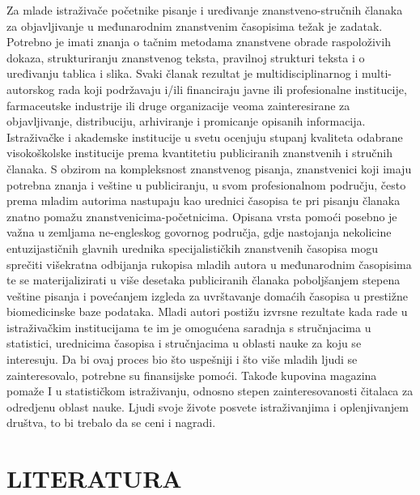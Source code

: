 \documentclass[12pt,a4paper]{article}
\begin{document}
    Za mlade istraživače početnike pisanje i uređivanje znanstveno-stručnih članaka za objavljivanje u međunarodnim znanstvenim časopisima težak je zadatak. Potrebno je imati znanja o tačnim metodama znanstvene obrade raspoloživih dokaza, strukturiranju znanstvenog teksta, pravilnoj strukturi teksta i o uređivanju tablica i slika. Svaki članak rezultat je multidisciplinarnog i multi-autorskog rada koji podržavaju i/ili financiraju javne ili profesionalne institucije, farmaceutske industrije ili druge organizacije veoma zainteresirane za objavljivanje, distribuciju, arhiviranje i promicanje opisanih informacija.
    Istraživačke i akademske institucije u svetu ocenjuju stupanj kvaliteta odabrane visokoškolske institucije prema kvantitetiu publiciranih znanstvenih i stručnih članaka. S obzirom na kompleksnost znanstvenog pisanja, znanstvenici koji imaju potrebna znanja i veštine u publiciranju, u svom profesionalnom području, često prema mladim autorima nastupaju kao urednici časopisa te pri pisanju članaka znatno pomažu znanstvenicima-početnicima. Opisana vrsta pomoći posebno je važna u zemljama ne-engleskog govornog područja, gdje nastojanja nekolicine entuzijastičnih glavnih urednika specijalističkih znanstvenih časopisa mogu sprečiti višekratna odbijanja rukopisa mladih autora u međunarodnim časopisima te se materijalizirati u više desetaka publiciranih članaka poboljšanjem stepena veštine pisanja i povećanjem izgleda za uvrštavanje domaćih časopisa u prestižne biomedicinske baze podataka. Mladi autori postižu izvrsne rezultate kada rade u istraživačkim institucijama te im je omogućena saradnja s stručnjacima u statistici, urednicima časopisa i stručnjacima u oblasti nauke za koju se interesuju. Da bi ovaj proces bio što uspešniji i što više mladih ljudi se zainteresovalo, potrebne su finansijske pomoći. Takođe kupovina magazina pomaže I u statističkom istraživanju, odnosno stepen zainteresovanosti čitalaca za odredjenu oblast nauke. Ljudi svoje živote posvete istraživanjima i oplenjivanjem društva, to bi trebalo da se ceni i nagradi.

\newpage
\section{LITERATURA}
\end{document}
